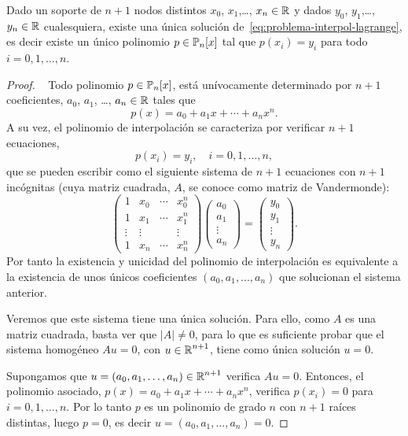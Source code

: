 \begin{theorem}
  \label{thm:existencia-unicidad-lagrange}
  Dado un soporte de $n+1$ nodos distintos $x_0$, $x_1$,\dots, $x_n
  \in \operatorname{{\mathbb R}}$ y dados $y_0$, $y_1$,\dots, $y_n\in\operatorname{{\mathbb R}}$ cualesquiera,
  existe una única solución de~\eqref{eq:problema-interpol-lagrange},
  es decir existe un único polinomio $p\in\operatorname{{\mathbb P}}_n[x]$ tal que
  $p(x_i)=y_i$ para todo $i=0,1,\dots,n$.
\end{theorem}
\begin{proof}~
  Todo polinomio $p\in\operatorname{{\mathbb P}}_n[x]$, está unívocamente determinado por
  $n+1$ coeficientes, $a_0$, $a_1$, \dots, $a_n\in\operatorname{{\mathbb R}}$ tales que
  \begin{equation}
    p(x)=a_0 + a_1 x + \cdots + a_n x^n.
  \end{equation}
  A su vez, el polinomio de interpolación se caracteriza por verificar
  $n+1$ ecuaciones,
  $$
  p(x_i)=y_i, \quad i=0,1,\dots,n,
  $$
  que se pueden escribir como el siguiente sistema de $n+1$ ecuaciones
  con $n+1$ incógnitas (cuya matriz cuadrada, $A$, se conoce como
  matriz de Vandermonde):
  \begin{equation}
    \begin{pmatrix}
      1 & x_0& \cdots & x_0^n \\
      1 & x_1& \cdots & x_1^n \\
      \vdots & \vdots & & \vdots \\
      1 & x_n& \cdots & x_n^n 
    \end{pmatrix}
    \begin{pmatrix}
      a_0 \\ a_1 \\ \vdots \\ a_n
    \end{pmatrix}
    =
    \begin{pmatrix}
      y_0 \\ y_1 \\ \vdots \\ y_n
    \end{pmatrix}.
  \end{equation}
  Por tanto la existencia y unicidad del polinomio de interpolación es
  equivalente a la existencia de unos únicos coeficientes
  $(a_0,a_1,...,a_n)$ que solucionan el sistema anterior.
  
    Veremos que
  este sistema tiene una única solución. Para ello, como $A$ es una
  matriz cuadrada, basta ver que $|A|\neq 0$, para lo que es suficiente
  probar que el sistema homogéneo $Au=0$, con $u\in\operatorname{{\mathbb R}}^{n+1}$, tiene
  como única solución $u=0$.

  Supongamos que $u=(a_0,a_1,\dots,a_n) \in\operatorname{{\mathbb R}}^{n+1}$ verifica
  $Au=0$. Entonces, el polinomio asociado, $p(x)=a_0 + a_1x + \cdots
  + a_n x^n$, verifica $p(x_i)=0$ para $i=0,1,\dots,n$.  Por lo tanto $p$ es un
  polinomio de grado $n$ con $n+1$ raíces distintas, luego
  $p=0$, es decir $u=(a_0,a_1,\dots,a_n)=0$. 
\end{proof}

